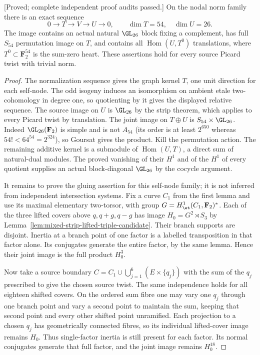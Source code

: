 \begin{lemma}
\label{lem:mixed-d3-norm-block-shears-candidate}
\textup{[Proved; complete independent proof audits passed.]}
On the nodal norm family there is an exact sequence
\[
       0\longrightarrow T\longrightarrow V\longrightarrow U
          \longrightarrow0,
       \qquad \dim T=54,\quad\dim U=26.
\]
The image contains an actual natural $\GL_{26}$ block fixing a
complement, has full $S_{54}$ permutation image on $T$, and
contains all $\operatorname{Hom}(U,T^0)$ translations, where
$T^0\subset\mathbf F_2^{54}$ is the sum-zero heart. These
assertions hold for every source Picard twist with trivial norm.
\end{lemma}
\begin{proof}
The normalization sequence gives the graph kernel $T$, one
unit direction for each self-node. The odd isogeny induces an
isomorphism on ambient etale two-cohomology in degree one,
so quotienting by it gives the displayed relative sequence.
The source image on $U$ is $\GL_{26}$ by the strip theorem,
which applies to every Picard twist by translation.
The joint image on $T\oplus U$ is $S_{54}\times\GL_{26}$.
Indeed $\GL_{26}(\mathbf F_2)$ is simple and is not $A_{54}$
(its order is at least $2^{650}$ whereas
$54!<64^{54}=2^{324}$), so Goursat gives the product.
Kill the permutation action. The remaining additive kernel
is a submodule of $\operatorname{Hom}(U,T)$, a direct sum
of natural-dual modules. The proved vanishing of their $H^1$
and of the $H^1$ of every quotient supplies an actual
block-diagonal $\GL_{26}$ by the cocycle argument.

It remains to prove the gluing assertion for this self-node
family; it is not inferred from independent intersection
systems. Fix a curve $C_1$ from the first lemma and use its
maximal elementary two-torsor, with group
$G=H^1_{\et}(C_1,\mathbf F_2)^*$.
Each of the three lifted covers above $q,q+g,q-g$ has image
$H_0=G^2\rtimes S_3$ by
Lemma~\ref{lem:mixed-strip-lifted-triple-candidate}.
Their branch supports are disjoint. Inertia at a branch point
of one factor is a labelled transposition in that factor alone.
Its conjugates generate the entire factor, by the same lemma.
Hence their joint image is the full product $H_0^3$.

Now take a source boundary
$C=C_1\cup\bigcup_{j=1}^6(E\times\{q_j\})$ with the sum
of the $q_j$ prescribed to give the chosen source twist.
The same independence holds for all eighteen shifted covers.
On the ordered sum fibre one may vary one $q_j$ through one
branch point and vary a second point to maintain the sum,
keeping that second point and every other shifted point
unramified. Each projection to a chosen $q_j$ has geometrically
connected fibres, so its individual lifted-cover image remains
$H_0$. Thus single-factor inertia is still present for
each factor. Its normal conjugates generate that full factor,
and the joint image remains $H_0^{18}$.


\end{proof}

